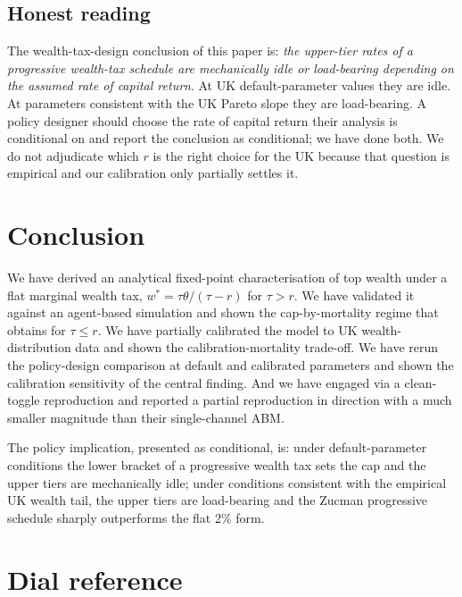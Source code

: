 \documentclass[11pt]{article}
\begin{document}
\subsection{Honest reading}

The wealth-tax-design conclusion of this paper is:
\emph{the upper-tier rates of a progressive wealth-tax schedule are
mechanically idle or load-bearing depending on the assumed rate of
capital return}.  At UK default-parameter values they are idle.  At
parameters consistent with the UK Pareto slope they are load-bearing.
A policy designer should choose the rate of capital return their
analysis is conditional on and report the conclusion as conditional;
we have done both.  We do not adjudicate which $r$ is the right
choice for the UK because that question is empirical and our
calibration only partially settles it.

\section{Conclusion}

We have derived an analytical fixed-point characterisation of top
wealth under a flat marginal wealth tax,
$w^* = \tau \theta / (\tau - r)$ for $\tau > r$.  We have validated
it against an agent-based simulation and shown the
cap-by-mortality regime that obtains for $\tau \leq r$.  We have
partially calibrated the model to UK wealth-distribution data and
shown the calibration-mortality trade-off.  We have rerun the
policy-design comparison at default and calibrated parameters and
shown the calibration sensitivity of the central finding.  And we
have engaged \citet{spangler2022distribution} via a clean-toggle
reproduction and reported a partial reproduction in direction with
a much smaller magnitude than their single-channel ABM.

The policy implication, presented as conditional, is: under
default-parameter conditions the lower bracket of a progressive
wealth tax sets the cap and the upper tiers are mechanically idle;
under conditions consistent with the empirical UK wealth tail, the
upper tiers are load-bearing and the Zucman progressive schedule
sharply outperforms the flat 2\% form.




\appendix
\section{Dial reference}
\label{app:dials}
\end{document}
